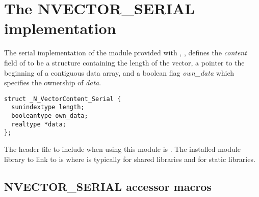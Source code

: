 \section{The NVECTOR\_SERIAL implementation}\label{ss:nvec_ser}

The serial implementation of the {\nvector} module provided with {\sundials},
{\nvecs}, defines the {\em content} field of  to be a structure
containing the length of the vector, a pointer to the beginning of a contiguous
data array, and a boolean flag {\em own\_data} which specifies the ownership
of {\em data}.
\begin{verbatim}
struct _N_VectorContent_Serial {
  sunindextype length;
  booleantype own_data;
  realtype *data;
};
\end{verbatim}

The header file to include when using this module is .
The installed module library to link to is
where  is typically  for shared libraries and 
for static libraries.


\subsection{NVECTOR\_SERIAL accessor macros}
\label{ss:nvec_ser_macros}

